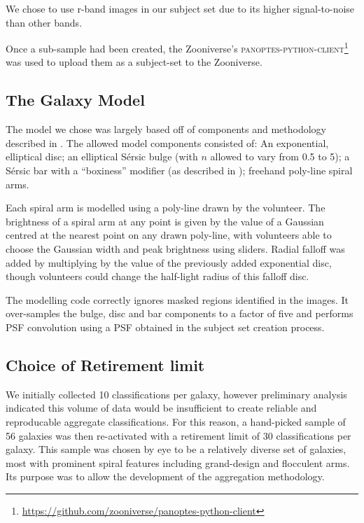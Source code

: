\documentclass[../main.tex]{subfiles}
\begin{document}
We chose to use r-band images in our subject set due to its higher signal-to-noise than other bands.

Once a sub-sample had been created, the Zooniverse's \textsc{panoptes-python-client}\footnote{\url{https://github.com/zooniverse/panoptes-python-client}} was used to upload them as a subject-set to the Zooniverse.


\subsection{The Galaxy Model}
\label{section:galaxy-model}

The model we chose was largely based off of components and methodology described in \citet{galfit-paper}. The allowed model components consisted of: An exponential, elliptical disc; an elliptical S\'ersic bulge (with $n$ allowed to vary from 0.5 to 5); a S\'ersic bar with a ``boxiness'' modifier (as described in \citealt{galfit-paper}); freehand poly-line spiral arms.

Each spiral arm is modelled using a poly-line drawn by the volunteer. The brightness of a spiral arm at any point is given by the value of a Gaussian centred at the nearest point on any drawn poly-line, with volunteers able to choose the Gaussian width and peak brightness using sliders. Radial falloff was added by multiplying by the value of the previously added exponential disc, though volunteers could change the half-light radius of this falloff disc.

The modelling code correctly ignores masked regions identified in the images. It over-samples the bulge, disc and bar components to a factor of five and performs PSF convolution using a PSF obtained in the subject set creation process. 

\subsection{Choice of Retirement limit}
\label{sec:retirement-limit}

We initially collected 10 classifications per galaxy, however preliminary analysis indicated this volume of data would be insufficient to create reliable and reproducable aggregate classifications. For this reason, a hand-picked sample of 56 galaxies was then re-activated with a retirement limit of 30 classifications per galaxy. This sample was chosen by eye to be a relatively diverse set of galaxies, most with prominent spiral features including grand-design and flocculent arms. Its purpose was to allow the development of the aggregation methodology.
\end{document}

